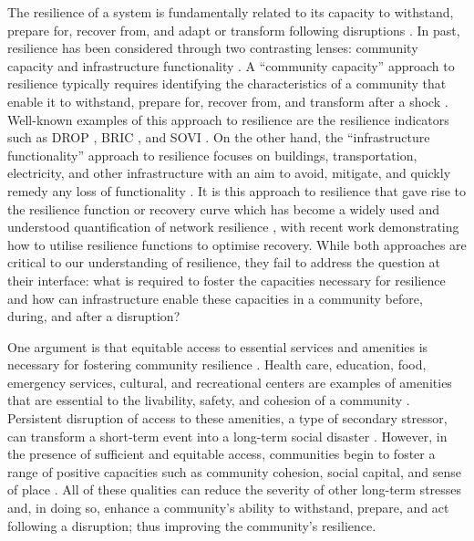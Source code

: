 \documentclass[review,3p,times,onecolumn,sort&compress,12pt]{elsarticle}
\let \cite \parencite
\begin{document}
The resilience of a system is fundamentally related to its capacity to withstand, prepare for, recover from, and adapt or transform following disruptions \cite{Bene2012-mx, Meerow2016-definingRes, GillespieMarthaler2019-ak,Cutter2016-xv}.
In past, resilience has been considered through two contrasting lenses: community capacity \cite{Cutter2014-lr, Zautra2008-nc} and infrastructure functionality \cite{lin2018empirical, Cutter2014-lr}.
A ``community capacity'' approach to resilience typically requires identifying the characteristics of a community that enable it to withstand, prepare for, recover from, and transform after a shock \cite{Cutter2010-ee, Cutter2016-xv, Cutter2014-lr, Sherrieb2010-lk}.
Well-known examples of this approach to resilience are the resilience indicators such as DROP \cite{Cutter2008-if}, BRIC \cite{Cutter2014-lr}, and SOVI \cite{Cutter2003-xi}.
On the other hand, the ``infrastructure functionality'' approach to resilience focuses on buildings, transportation, electricity, and other infrastructure with an aim to avoid,  mitigate, and quickly remedy any loss of functionality \cite{Bruneau2003-lk, Barker2013-uf, Curt2018-mm, Guidotti2016-hc, Hosseini2016-ae, Haimes2009-oi}.
It is this approach to resilience that gave rise to the resilience function or recovery curve which has become a widely used and understood quantification of network resilience \cite{Bruneau2006-jg, Sharma2018-uh}, with recent work demonstrating how to utilise resilience functions to optimise recovery.
While both approaches are critical to our understanding of resilience, they fail to address the question at their interface: 
what is required to foster the capacities necessary for resilience and how can infrastructure enable these capacities in a community before, during, and after a disruption?

One argument is that equitable access to essential services and amenities is necessary for fostering community resilience \cite{logan2020reframing}.
Health care, education, food, emergency services, cultural, and recreational centers are examples of amenities that are essential to the livability, safety, and cohesion of a community \cite{Contreras2017-wn, Dempsey2011-sv, Talen2003-iy, winter1997coordinating, logan2020reframing, unesco-jn}.
Persistent disruption of access to these amenities, a type of secondary stressor, can transform a short-term event into a long-term social disaster \cite{watt-ht, Netter_2016-zp, Contreras2017-wn, Lock2012-ov}.
However, in the presence of sufficient and equitable access, communities begin to foster a range of positive capacities such as community cohesion, social capital, and sense of place \cite{Jennings2019-jk, Forrest2001-wz}.
All of these qualities can reduce the severity of other long-term stresses and, in doing so, enhance a community's ability to withstand, prepare, and act following a disruption; thus improving the community's resilience.
\end{document}
